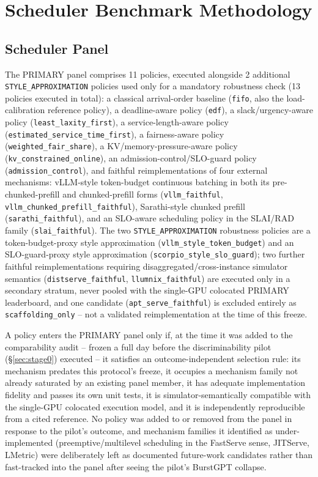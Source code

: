 \section{Scheduler Benchmark Methodology}
\label{sec:methodology}

\subsection{Scheduler Panel}
\label{sec:panel}

The PRIMARY panel comprises 11 policies, executed alongside 2 additional
\texttt{STYLE\_APPROXIMATION} policies used only for a mandatory robustness
check (13 policies executed in total): a classical arrival-order baseline
(\texttt{fifo}, also the load-calibration reference policy), a
deadline-aware policy (\texttt{edf}), a slack/urgency-aware policy
(\texttt{least\_laxity\_first}), a service-length-aware policy
(\texttt{estimated\_service\_time\_first}), a fairness-aware policy
(\texttt{weighted\_fair\_share}), a KV/memory-pressure-aware policy
(\texttt{kv\_constrained\_online}), an admission-control/SLO-guard policy
(\texttt{admission\_control}), and faithful reimplementations of four
external mechanisms: vLLM-style token-budget continuous batching in both
its pre-chunked-prefill and chunked-prefill forms
(\texttt{vllm\_faithful}, \texttt{vllm\_chunked\_prefill\_faithful}),
Sarathi-style chunked prefill (\texttt{sarathi\_faithful}), and an
SLO-aware scheduling policy in the SLAI/RAD family
(\texttt{slai\_faithful}). The two \texttt{STYLE\_APPROXIMATION} robustness
policies are a token-budget-proxy style approximation
(\texttt{vllm\_style\_token\_budget}) and an SLO-guard-proxy style
approximation (\texttt{scorpio\_style\_slo\_guard}); two further faithful
reimplementations requiring disaggregated/cross-instance simulator
semantics (\texttt{distserve\_faithful}, \texttt{llumnix\_faithful}) are
executed only in a secondary stratum, never pooled with the single-GPU
colocated PRIMARY leaderboard, and one candidate
(\texttt{apt\_serve\_faithful}) is excluded entirely as
\texttt{scaffolding\_only} -- not a validated reimplementation at the time
of this freeze.

A policy enters the PRIMARY panel only if, at the time it was added to the
comparability audit -- frozen a full day before the discriminability
pilot (\S\ref{sec:stage0}) executed -- it satisfies an outcome-independent
selection rule: its mechanism predates this protocol's freeze, it
occupies a mechanism family not already saturated by an existing panel
member, it has adequate implementation fidelity and passes its own unit
tests, it is simulator-semantically compatible with the single-GPU
colocated execution model, and it is independently reproducible from a
cited reference. No policy was added to or removed from the panel in
response to the pilot's outcome, and mechanism families it identified as
under-implemented (preemptive/multilevel scheduling in the FastServe
sense, JITServe, LMetric) were deliberately left as documented future-work
candidates rather than fast-tracked into the panel after seeing the
pilot's BurstGPT collapse.


